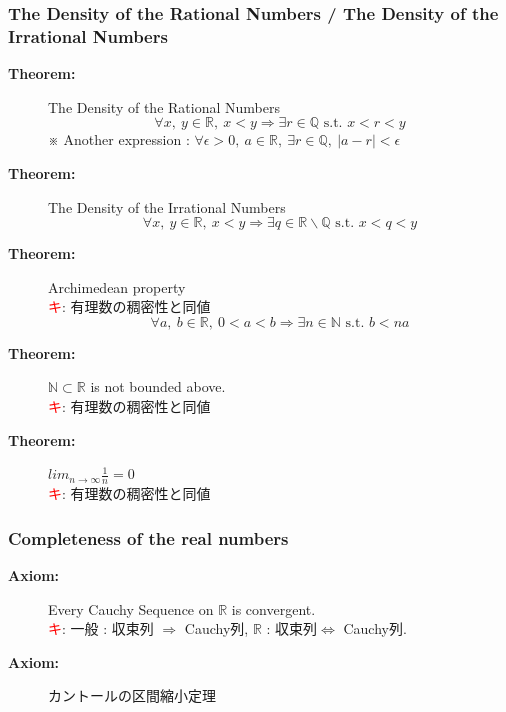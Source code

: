 \documentclass[english,dvipdfmx]{jsarticle}
\newcommand*{\point}{\textcircled{\textcolor{red}{\scriptsize キ}}}
\begin{document}
    \subsubsection{The Density of the Rational Numbers / The Density of the Irrational Numbers}
        \begin{description}
            \item[\bf{Theorem:}] The Density of the Rational Numbers
                \begin{equation*}
                    \forall x,\ y \in \mathbb{R},\ x < y \Rightarrow \exists r \in \mathbb{Q} \text{  s.t. } x < r < y
                \end{equation*}
                ※ Another expression : $ \forall \epsilon > 0 ,\ a \in \mathbb{R} ,\ \exists r \in \mathbb{Q},\ | a - r | < \epsilon $
            \item[\bf{Theorem:}] The Density of the Irrational Numbers
                \begin{equation*}
                    \forall x,\ y \in \mathbb{R},\ x < y \Rightarrow \exists q \in \mathbb{R} \backslash \mathbb{Q} \text{  s.t. } x < q < y
                \end{equation*}
            \item[\bf{Theorem:}] Archimedean property \\
                \point : 有理数の稠密性と同値 
                \begin{equation*}
                    \forall a,\ b \in \mathbb{R},\ 0 < a < b \Rightarrow \exists n \in \mathbb{N} \text{ s.t. } b < na
                \end{equation*}
            \item[\bf{Theorem:}] $\mathbb{N} \subset \mathbb{R}$ is not bounded above. \\
                \point : 有理数の稠密性と同値
            \item[\bf{Theorem:}] $lim_{n \to \infty} \frac{1}{n} = 0$ \\
                \point : 有理数の稠密性と同値
        \end{description}
    \subsubsection{Completeness of the real numbers}
        \begin{description}
            \item[\bf{Axiom:}] Every Cauchy Sequence on $\mathbb{R}$ is convergent. \\
            \point : 一般 : 収束列 $\Rightarrow$ Cauchy列, $\mathbb{R}$ : 収束列$\Leftrightarrow$ Cauchy列.
            \item[\bf{Axiom:}] カントールの区間縮小定理
        \end{description}
\end{document}
